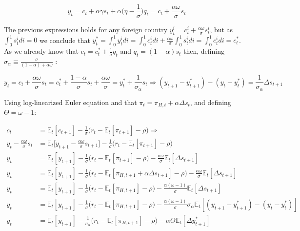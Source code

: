 \documentclass{article}
\newcommand{\Et}{\mathbb{E}_t}
\begin{document}
$$y_t = c_t + \alpha \gamma s_t + \alpha \bigg( \eta - \frac{1}{\sigma} \bigg) q_t = c_t + \frac{\alpha\omega}{\sigma} s_t$$

The previous expressions holds for any foreign country $y_t^i = c_t^i + \frac{\alpha\omega}{\sigma} s^i_t$, but as $\int^1_0 s^i_t di = 0$ we conclude that $y^*_t = \int_0^1 y^i_t di = \int_0^1 c^i_t di + \frac{\alpha\omega}{\sigma} \int_0^1 s^i_t di =\int_0^1 c^i_t di = c^*_t $. As we already know that $c_t = c^*_t + \frac{1}{\sigma} q_t$ and $q_t = (1-\alpha) s_t$ then, defining $\sigma_\alpha \equiv \frac{\sigma}{(1 - \alpha) + \alpha \omega}$ :

$$y_t = c_t + \frac{\alpha\omega}{\sigma} s_t = c^*_t + \frac{1-\alpha}{\sigma} s_t + \frac{\alpha \omega}{\sigma} = y_t^* + \frac{1}{\sigma_\alpha}s_t \Rightarrow (y_{t+1} - y_{t+1}^*) - (y_{t} - y_{t}^*) = \frac{1}{\sigma_\alpha} \Delta s_{t+1}$$

Using log-linearized Euler equation and that $\pi_t = \pi_{H,t} + \alpha \Delta s_t$, and defining $\Theta = \omega-1$:

\begin{equation*}
    \begin{split}
        c_t & = \Et[c_{t+1}] - \frac{1}{\sigma} \Big(r_t - \Et[\pi_{t+1}] - \rho \Big) \Rightarrow\\
        y_t - \frac{\alpha\omega}{\sigma} s_t &= \Et\Big[y_{t+1} - \frac{\alpha\omega}{\sigma} s_{t+1}\Big] - \frac{1}{\sigma} \Big(r_t - \Et[\pi_{t+1}] - \rho \Big)\\
        y_t &= \Et[y_{t+1} ] - \frac{1}{\sigma} \Big(r_t - \Et [\pi_{t+1} ] - \rho \Big) - \frac{\alpha\omega}{\sigma} \Et[\Delta s_{t+1}]\\
        y_t &= \Et[y_{t+1} ] - \frac{1}{\sigma} \Big(r_t - \Et [\pi_{H, t+1} + \alpha \Delta s_{t+1}] - \rho \Big) - \frac{\alpha\omega}{\sigma} \Et[\Delta s_{t+1}]\\
        y_t &= \Et[y_{t+1}] - \frac{1}{\sigma} \Big(r_t - \Et [\pi_{H, t+1}] - \rho \Big) - \frac{\alpha(\omega-1)}{\sigma} \Et[\Delta s_{t+1}]\\
        y_t &= \Et[y_{t+1} ] - \frac{1}{\sigma} \Big(r_t - \Et [\pi_{H, t+1}] - \rho \Big) - \frac{\alpha(\omega-1)}{\sigma} \sigma_\alpha \Et[(y_{t+1} - y_{t+1}^*) - (y_{t} - y_{t}^*)]\\
        y_t &= \Et[y_{t+1}] - \frac{1}{\sigma_\alpha} \Big(r_t - \Et [\pi_{H, t+1}] - \rho \Big) - \alpha \Theta \Et[\Delta y^*_{t+1}]\\
    \end{split}
\end{equation*}
\end{document}
